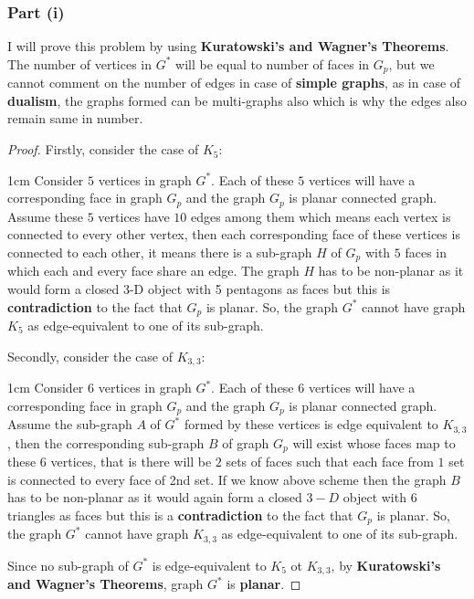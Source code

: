 \documentclass{article}
\let\bold\textbf
\newenvironment{myenv}{\begin{adjustwidth}{1cm}{}}{\end{adjustwidth}}
\begin{document}
{{    \subsubsection{Part (i)}{
      I will prove this problem by using \bold{Kuratowski's and Wagner's Theorems}. \newline
      The number of vertices in $G^*$ will be equal to number of faces in $G_p$, but we cannot comment on the number of edges in case of \bold{simple graphs}, as in case of \bold{dualism}, the graphs formed can be multi-graphs also which is why the edges also remain same in number.
      \begin{proof}
        Firstly, consider the case of $K_5$:
        \begin{myenv}
          Consider $5$ vertices in graph $G^*$. \newline
          Each of these $5$ vertices will have a corresponding face in graph $G_p$ and the graph $G_p$ is planar connected graph. \newline
          Assume these $5$ vertices have $10$ edges among them which means each vertex is connected to every other vertex, then each corresponding face of these vertices is connected to each other, it means there is a sub-graph $H$ of $G_p$ with $5$ faces in which each and every face share an edge. \newline
          The graph $H$ has to be non-planar as it would form a closed 3-D object with 5 pentagons as faces but this is \bold{contradiction} to the fact that $G_p$ is planar. \newline
          So, the graph $G^*$ cannot have graph $K_5$ as edge-equivalent to one of its sub-graph. \newline
        \end{myenv}
        Secondly, consider the case of $K_{3,3}$:
        \begin{myenv}
          Consider $6$ vertices in graph $G^*$. \newline
          Each of these $6$ vertices will have a corresponding face in graph $G_p$ and the graph $G_p$ is planar connected graph. \newline
          Assume the sub-graph $A$ of $G^*$ formed by these vertices is edge equivalent to $K_{3,3}$, then the corresponding sub-graph $B$ of graph $G_p$ will exist whose faces map to these $6$ vertices, that is there will be $2$ sets of faces such that each face from $1$ set is connected to every face of 2nd set. \newline
          If we know above scheme then the graph $B$ has to be non-planar as it would again form a closed $3-D$ object with $6$ triangles as faces but this is a \bold{contradiction} to the fact that $G_p$ is planar. \newline
          So, the graph $G^*$ cannot have graph $K_{3,3}$ as edge-equivalent to one of its sub-graph.
        \end{myenv}
        Since no sub-graph of $G^*$ is edge-equivalent to $K_5$ ot $K_{3,3}$, by \bold{Kuratowski’s and Wagner’s Theorems}, graph $G^*$ is \bold{planar}.
      \end{proof}
    }
}}
\end{document}
